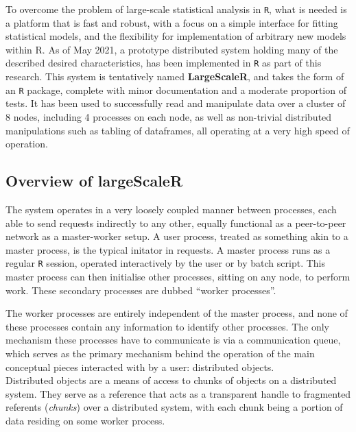 To overcome the problem of large-scale statistical analysis in \texttt{R}, what is needed is a platform that is fast and robust, with a focus on a simple interface for fitting statistical models, and the flexibility for implementation of arbitrary new models within R.
As of May 2021, a prototype distributed system holding many of the described desired characteristics, has been implemented in \texttt{R} as part of this research.
This system is tentatively named \textbf{LargeScaleR}, and takes the form of an \texttt{R} package, complete with minor documentation and a moderate proportion of tests.
It has been used to successfully read and manipulate data over a cluster of 8 nodes, including 4 processes on each node, as well as non-trivial distributed manipulations such as tabling of dataframes, all operating at a very high speed of operation.

\subsection{Overview of \textbf{largeScaleR}}\label{sec:sys-imp}

The system operates in a very loosely coupled manner between processes, each able to send requests indirectly to any other, equally functional as a peer-to-peer network as a master-worker setup.
A user process, treated as something akin to a master process, is the typical initator in requests. 
A master process runs as a regular \texttt{R} session, operated interactively by the user or by batch script.
This master process can then initialise other processes, sitting on any node, to perform work.
These secondary processes are dubbed ``worker processes''.

The worker processes are entirely independent of the master process, and none of these processes contain any information to identify other processes.
The only mechanism these processes have to communicate is via a communication queue, which serves as the primary mechanism behind the operation of the main conceptual pieces interacted with by a user: distributed objects.\\

Distributed objects are a means of access to chunks of objects on a distributed system\cite{emmerich2000engineering}.
They serve as a reference that acts as a transparent handle to fragmented referents (\textit{chunks}) over a distributed system, with each chunk being a portion of data residing on some worker process.\\

